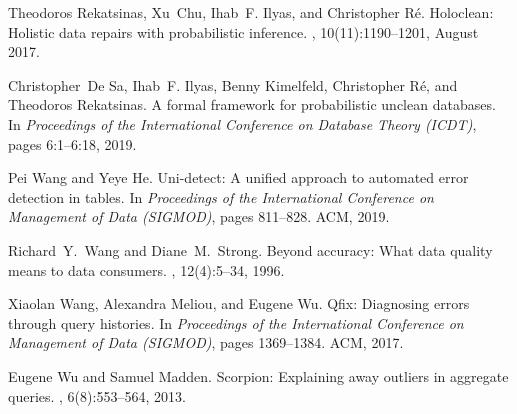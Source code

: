 \documentclass[11pt]{article}
\begin{document}
\begin{thebibliography}{10}
Theodoros Rekatsinas, Xu~Chu, Ihab~F. Ilyas, and Christopher R\'{e}.
\newblock Holoclean: Holistic data repairs with probabilistic inference.
, 10(11):1190–1201, August 2017.

Christopher~De Sa, Ihab~F. Ilyas, Benny Kimelfeld, Christopher R{\'e}, and
  Theodoros Rekatsinas.
\newblock A formal framework for probabilistic unclean databases.
\newblock In {\em Proceedings of the International Conference on Database
  Theory (ICDT)}, pages 6:1--6:18, 2019.

Pei Wang and Yeye He.
\newblock Uni-detect: {A} unified approach to automated error detection in
  tables.
\newblock In {\em Proceedings of the International Conference on Management of
  Data (SIGMOD)}, pages 811--828. {ACM}, 2019.

Richard~Y.\ Wang and Diane~M.\ Strong.
\newblock Beyond accuracy: What data quality means to data consumers.
, 12(4):5--34, 1996.

Xiaolan Wang, Alexandra Meliou, and Eugene Wu.
\newblock Qfix: Diagnosing errors through query histories.
\newblock In {\em Proceedings of the International Conference on Management of
  Data (SIGMOD)}, pages 1369--1384. {ACM}, 2017.

Eugene Wu and Samuel Madden.
\newblock Scorpion: Explaining away outliers in aggregate queries.
, 6(8):553--564, 2013.

\end{thebibliography}
%

%
\end{document}
